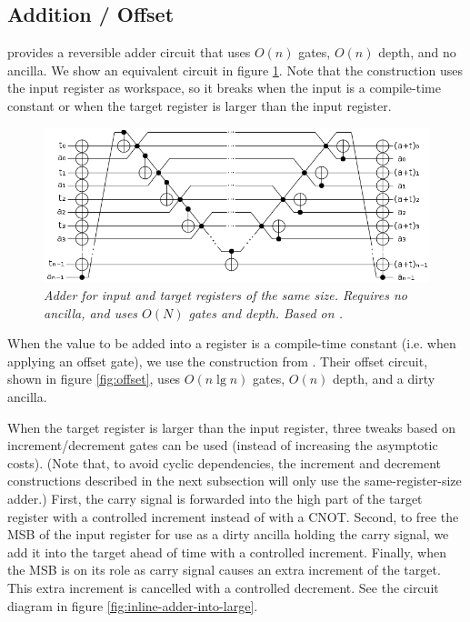 \documentclass[twocolumn]{article}
\begin{document}
\subsection{Addition / Offset}

\cite{takahashi2005} provides a reversible adder circuit that uses $O(n)$ gates, $O(n)$ depth, and no ancilla.
We show an equivalent circuit in figure \ref{fig:inlineadder}.
Note that the construction uses the input register as workspace, so it breaks when the input is a compile-time constant or when the target register is larger than the input register.

\begin{figure}
  \centering
  \includegraphics[width=\linewidth]{assets/inline-adder.png}
  \caption{\em Adder for input and target registers of the same size.
  Requires no ancilla, and uses $O(N)$ gates and depth.
  Based on \cite{van2004, takahashi2005}.}
  \label{fig:inlineadder}
\end{figure}

When the value to be added into a register is a compile-time constant (i.e. when applying an offset gate), we use the construction from \cite{haner2016}.
Their offset circuit, shown in figure \ref{fig:offset}, uses $O(n \lg n)$ gates, $O(n)$ depth, and a dirty ancilla.

When the target register is larger than the input register, three tweaks based on increment/decrement gates can be used (instead of increasing the asymptotic costs).
(Note that, to avoid cyclic dependencies, the increment and decrement constructions described in the next subsection will only use the same-register-size adder.)
First, the carry signal is forwarded into the high part of the target register with a controlled increment instead of with a CNOT.
Second, to free the MSB of the input register for use as a dirty ancilla holding the carry signal, we add it into the target ahead of time with a controlled increment.
Finally, when the MSB is on its role as carry signal causes an extra increment of the target.
This extra increment is cancelled with a controlled decrement.
See the circuit diagram in figure \ref{fig:inline-adder-into-large}.
\end{document}
